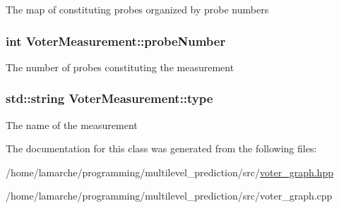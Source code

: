 The map of constituting probes organized by probe numbers \hypertarget{class_voter_measurement_a8cd0709289a4d1af82586d4b09c5a43a}{
\subsubsection[{probe\-Number}]{\setlength{\rightskip}{0pt plus 5cm}int Voter\-Measurement\-::probe\-Number}}\label{class_voter_measurement_a8cd0709289a4d1af82586d4b09c5a43a}
The number of probes constituting the measurement \hypertarget{class_voter_measurement_ad4471a133827f052622a84c4a451aabe}{
\subsubsection[{type}]{\setlength{\rightskip}{0pt plus 5cm}std\-::string Voter\-Measurement\-::type}}\label{class_voter_measurement_ad4471a133827f052622a84c4a451aabe}
The name of the measurement 

The documentation for this class was generated from the following files\-:\begin{DoxyCompactItemize}
\item 
/home/lamarche/programming/multilevel\-\_\-prediction/src/\hyperlink{voter__graph_8hpp}{voter\-\_\-graph.\-hpp}\item 
/home/lamarche/programming/multilevel\-\_\-prediction/src/voter\-\_\-graph.\-cpp\end{DoxyCompactItemize}
